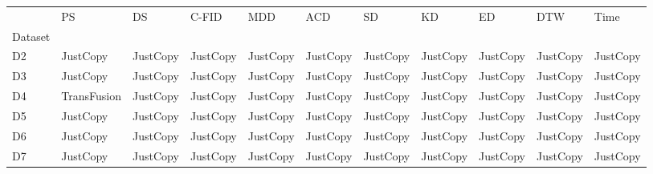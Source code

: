 \begin{tabular}{lllllllllll}
{} & {PS} & {DS} & {C-FID} & {MDD} & {ACD} & {SD} & {KD} & {ED} & {DTW} & {Time} \\
{Dataset} & {} & {} & {} & {} & {} & {} & {} & {} & {} & {} \\
D2 & \cellcolor[HTML]{20B2AA} JustCopy & \cellcolor[HTML]{20B2AA} JustCopy & \cellcolor[HTML]{20B2AA} JustCopy & \cellcolor[HTML]{20B2AA} JustCopy & \cellcolor[HTML]{20B2AA} JustCopy & \cellcolor[HTML]{20B2AA} JustCopy & \cellcolor[HTML]{20B2AA} JustCopy & \cellcolor[HTML]{20B2AA} JustCopy & \cellcolor[HTML]{20B2AA} JustCopy & \cellcolor[HTML]{20B2AA} JustCopy \\
D3 & \cellcolor[HTML]{20B2AA} JustCopy & \cellcolor[HTML]{20B2AA} JustCopy & \cellcolor[HTML]{20B2AA} JustCopy & \cellcolor[HTML]{20B2AA} JustCopy & \cellcolor[HTML]{20B2AA} JustCopy & \cellcolor[HTML]{20B2AA} JustCopy & \cellcolor[HTML]{20B2AA} JustCopy & \cellcolor[HTML]{20B2AA} JustCopy & \cellcolor[HTML]{20B2AA} JustCopy & \cellcolor[HTML]{20B2AA} JustCopy \\
D4 & \cellcolor[HTML]{90EE90} TransFusion & \cellcolor[HTML]{20B2AA} JustCopy & \cellcolor[HTML]{20B2AA} JustCopy & \cellcolor[HTML]{20B2AA} JustCopy & \cellcolor[HTML]{20B2AA} JustCopy & \cellcolor[HTML]{20B2AA} JustCopy & \cellcolor[HTML]{20B2AA} JustCopy & \cellcolor[HTML]{20B2AA} JustCopy & \cellcolor[HTML]{20B2AA} JustCopy & \cellcolor[HTML]{20B2AA} JustCopy \\
D5 & \cellcolor[HTML]{20B2AA} JustCopy & \cellcolor[HTML]{20B2AA} JustCopy & \cellcolor[HTML]{20B2AA} JustCopy & \cellcolor[HTML]{20B2AA} JustCopy & \cellcolor[HTML]{20B2AA} JustCopy & \cellcolor[HTML]{20B2AA} JustCopy & \cellcolor[HTML]{20B2AA} JustCopy & \cellcolor[HTML]{20B2AA} JustCopy & \cellcolor[HTML]{20B2AA} JustCopy & \cellcolor[HTML]{20B2AA} JustCopy \\
D6 & \cellcolor[HTML]{20B2AA} JustCopy & \cellcolor[HTML]{20B2AA} JustCopy & \cellcolor[HTML]{20B2AA} JustCopy & \cellcolor[HTML]{20B2AA} JustCopy & \cellcolor[HTML]{20B2AA} JustCopy & \cellcolor[HTML]{20B2AA} JustCopy & \cellcolor[HTML]{20B2AA} JustCopy & \cellcolor[HTML]{20B2AA} JustCopy & \cellcolor[HTML]{20B2AA} JustCopy & \cellcolor[HTML]{20B2AA} JustCopy \\
D7 & \cellcolor[HTML]{20B2AA} JustCopy & \cellcolor[HTML]{20B2AA} JustCopy & \cellcolor[HTML]{20B2AA} JustCopy & \cellcolor[HTML]{20B2AA} JustCopy & \cellcolor[HTML]{20B2AA} JustCopy & \cellcolor[HTML]{20B2AA} JustCopy & \cellcolor[HTML]{20B2AA} JustCopy & \cellcolor[HTML]{20B2AA} JustCopy & \cellcolor[HTML]{20B2AA} JustCopy & \cellcolor[HTML]{20B2AA} JustCopy \\
\end{tabular}